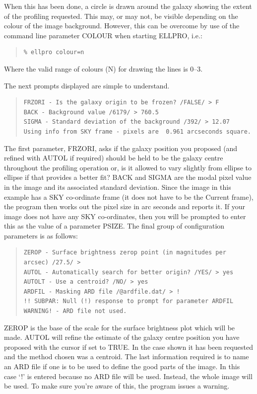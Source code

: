 \documentclass[twoside,11pt]{article}
\newenvironment{myquote}{\begin{quote}\begin{small}}{\end{small}\end{quote}}
\begin{document}
When this has been done, a circle is drawn around the galaxy showing the extent
of the profiling requested. This may, or may not, be visible depending on the
colour of the image background. However, this can be overcome by use of the
command line parameter COLOUR when starting ELLPRO, i.e.:

\begin{myquote}
\begin{verbatim}
% ellpro colour=n
\end{verbatim}
\end{myquote}

Where the valid range of colours (N) for drawing the lines is 0--3.

The next prompts displayed are simple to understand.

\begin{myquote}
\begin{verbatim}
FRZORI - Is the galaxy origin to be frozen? /FALSE/ > F
BACK - Background value /6179/ > 760.5
SIGMA - Standard deviation of the background /392/ > 12.07
Using info from SKY frame - pixels are  0.961 arcseconds square.
\end{verbatim}
\end{myquote}
The first parameter, FRZORI,
asks if the galaxy position you proposed (and refined with
AUTOL if required) should be held to
be the galaxy centre throughout the profiling operation or,
is it allowed to vary slightly
from ellipse to ellipse if that provides a better fit?
BACK and SIGMA are the modal pixel value in the image and its
associated standard deviation.
Since the image in this example has a SKY co-ordinate frame
(it does not have to be the Current frame),
the program then works out the pixel size in arc seconds and reports it.
If your image does not have any SKY co-ordinates, then you will
be prompted to enter this as the value of a parameter PSIZE.
The final group of configuration parameters is as follows:
\begin{myquote}
\begin{verbatim}
ZEROP - Surface brightness zerop point (in magnitudes per arcsec) /27.5/ >
AUTOL - Automatically search for better origin? /YES/ > yes
AUTOLT - Use a centroid? /NO/ > yes
ARDFIL - Masking ARD file /@ardfile.dat/ > !
!! SUBPAR: Null (!) response to prompt for parameter ARDFIL
WARNING! - ARD file not used.
\end{verbatim}
\end{myquote}
ZEROP is the base of the scale for the surface brightness plot
which will be made.
AUTOL will refine
the estimate of the galaxy centre position you have proposed with the cursor
if set to TRUE. In the case shown it has been requested and the method
chosen was a centroid.
The last information required is to name an ARD file if one is to be used to
define the good parts of the image. In this case `!' is entered because no
ARD file will be used. Instead, the whole image will be used. To make sure
you're aware of this, the program issues a warning.
\end{document}
